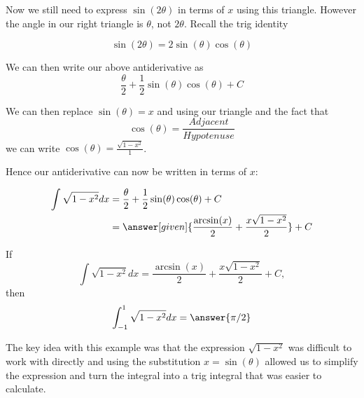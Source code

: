 \documentclass{ximera}
\begin{document}
\begin{example}
\begin{explanation}
    \begin{image}
    \end{image}

Now we still need to express $\sin(2\theta)$ in terms of $x$ using this triangle. However the angle in our 
right triangle is $\theta$, not $2\theta$. Recall the trig identity

\[
\sin(2\theta)=2\sin(\theta)\cos(\theta)
\]

We can then write our above antiderivative as 
\[
\frac{\theta}{2} +\frac{1}{2}\sin(\theta)\cos(\theta) + C
\]

We can then replace $\sin(\theta)=x$ and using our triangle and the fact that 
\[
\cos(\theta)=\frac{Adjacent}{Hypotenuse}
\]
we can write $\cos(\theta)=\frac{\sqrt{1-x^{2}}}{1}$.

Hence our antiderivative can now be written in terms of $x$:

    \begin{align*}
      \int \sqrt{1-x^2} dx &= \frac{\theta}{2} +\frac{1}{2}\sin(\theta)\cos(\theta)+C \\
      &= \answer[given]{\frac{\arcsin(x)}{2} + \frac{x\sqrt{1-x^2}}{2}} + C 
    \end{align*}
  \end{explanation}
\end{example}

\begin{question}
  If
  \[
  \int \sqrt{1-x^2} dx = \frac{\arcsin(x)}{2} + \frac{x\sqrt{1-x^2}}{2} + C,
  \]
  then
  \[
  \int_{-1}^{1}\sqrt{1-x^2} dx = \answer{\pi/2}
  \]
\end{question}



The key idea with this example was that the expression $\sqrt{1-x^{2}}$ was difficult to work with directly and 
using the substitution $x=\sin(\theta)$ allowed us to simplify the expression and turn the integral 
into a trig integral that was easier to calculate. 
\end{document}
